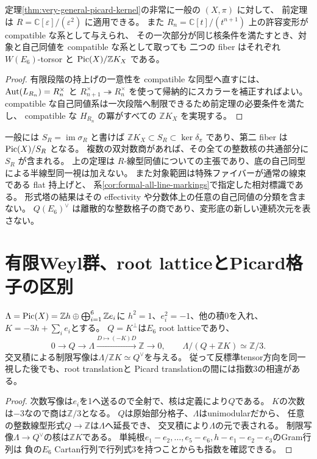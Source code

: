 \begin{corollary}[一次の場合と形式塔]\label{cor:first-order-pointings}
定理\ref{thm:very-general-picard-kernel}の非常に一般の $(X,\pi)$ に対して、
前定理は $R=\mathbb C[\varepsilon]/(\varepsilon^2)$ に適用できる。
また $R_n=\mathbb C[t]/(t^{n+1})$ 上の許容変形が compatible な系として与えられ、
その一次部分が同じ核条件を満たすとき、対象と自己同値を compatible な系として取っても
二つの fiber はそれぞれ $W(E_6)$-torsor と $\operatorname{Pic}(X)/\mathbb ZK_X$ である。
\end{corollary}
\begin{proof}
有限段階の持上げの一意性を compatible な同型へ直すには、
$\operatorname{Aut}(L_{R_n})=R_n^\times$ と
$R_{n+1}^\times\twoheadrightarrow R_n^\times$ を使って帰納的にスカラーを補正すればよい。
compatible な自己同値系は一次段階へ制限できるため前定理の必要条件を満たし、
compatible な $H_{R_n}$ の冪がすべての $\mathbb ZK_X$ を実現する。
\end{proof}

\begin{remark}[範囲と残る問題]
一般には $S_R=\operatorname{im}\sigma_R$ と書けば
$\mathbb ZK_X\subset S_R\subset\ker\delta_\pi$ であり、第二 fiber は $\operatorname{Pic}(X)/S_R$ となる。
複数の双対数商があれば、その全ての整数核の共通部分に $S_R$ が含まれる。
上の定理は $R$-線型同値についての主張であり、底の自己同型による半線型同一視は加えない。
また対象範囲は特殊ファイバーが通常の線束である flat 持上げと、
系\ref{cor:formal-all-line-markings}で指定した相対標識である。
形式塔の結果はその effectivity や分数体上の任意の自己同値の分類を含まない。
$Q(E_6)^\vee$ は離散的な整数格子の商であり、変形底の新しい連続次元を表さない。
\end{remark}

\section{有限Weyl群、root latticeとPicard格子の区別}
\begin{proposition}[反標準方向を除いたPicard格子]\label{prop:picard-root-index}
$\Lambda=\operatorname{Pic}(X)=\mathbb Zh\oplus\bigoplus_{i=1}^6\mathbb Ze_i$に
$h^2=1$、$e_i^2=-1$、他の積0を入れ、$K=-3h+\sum_i e_i$とする。
$Q=K^\perp$は$E_6$ root latticeであり、
\[
 0\longrightarrow Q\longrightarrow\Lambda
 \xrightarrow{D\mapsto(-K)D}\mathbb Z\longrightarrow0,
 \qquad \Lambda/(Q+\mathbb ZK)\simeq\mathbb Z/3.
\]
交叉積による制限写像は$\Lambda/\mathbb ZK\simeq Q^\vee$を与える。
従って反標準tensor方向を同一視した後でも、root translationと
Picard translationの間には指数3の相違がある。
\end{proposition}
\begin{proof}
次数写像は$e_i$を1へ送るので全射で、核は定義により$Q$である。
$K$の次数は$-3$なので商は$\mathbb Z/3$となる。
$Q$は原始部分格子、$\Lambda$はunimodularだから、
任意の整数線型形式$Q\to\mathbb Z$は$\Lambda$へ延長でき、
交叉積により$\Lambda$の元で表される。
制限写像$\Lambda\to Q^\vee$の核は$\mathbb ZK$である。
単純根$e_1-e_2,\ldots,e_5-e_6,h-e_1-e_2-e_3$のGram行列は
負の$E_6$ Cartan行列で行列式3を持つことからも指数を確認できる。
\end{proof}

